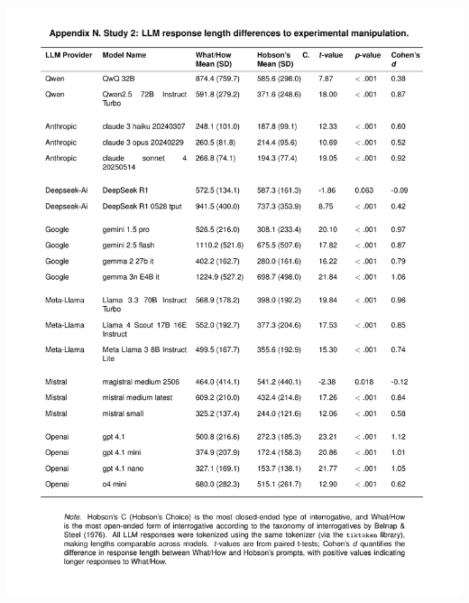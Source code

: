 \documentclass[
  12pt,
]{article}
\begin{document}
\begin{center}\includegraphics{../03_outputs/04_appendices/appendix_n} \end{center}
\end{document}
